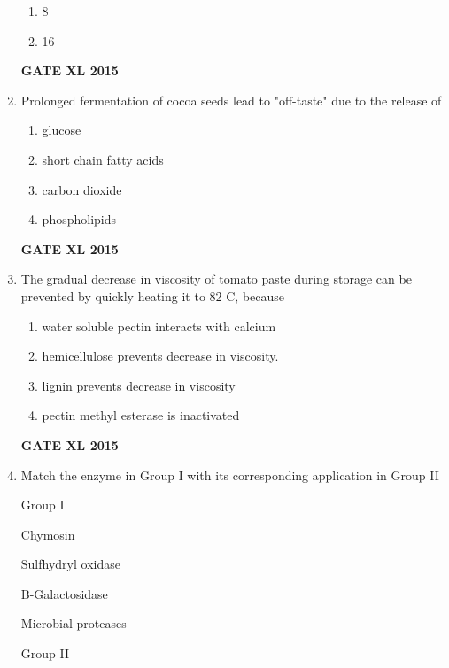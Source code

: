 \documentclass[journal,12pt,onecolumn]{IEEEtran}
\begin{document}
\begin{enumerate}
\begin{enumerate}
	    \item 8
            \item 16
    \end{enumerate}
\begin{flushright}\textbf{GATE XL 2015}\end{flushright}
\item Prolonged fermentation of cocoa seeds lead to "off-taste" due to the release of
    \begin{enumerate}
            \item glucose
	    \item short chain fatty acids 
	    \item  carbon dioxide
            \item phospholipids
    \end{enumerate}
\begin{flushright}\textbf{GATE XL 2015}\end{flushright}
\item The gradual decrease in viscosity of tomato paste during storage can be prevented by quickly heating it to 82 \degree C, because
    \begin{enumerate}
            \item water soluble pectin interacts with calcium
	    \item hemicellulose prevents decrease in viscosity.
	    \item lignin prevents decrease in viscosity
            \item pectin methyl esterase is inactivated
    \end{enumerate}
\begin{flushright}\textbf{GATE XL 2015}\end{flushright}
\item {Match the enzyme in Group I with its corresponding application in Group II}

	\begin{minipage}{0.5\textwidth}\begin{flushleft}
Group I

 Chymosin

 Sulfhydryl oxidase

 B-Galactosidase

 Microbial proteases
	\end{flushleft}
	\end{minipage}
	\begin{minipage}{0.5\textwidth}\begin{flushleft}
Group II


\end{flushleft}
\end{minipage}
\end{enumerate}
\end{document}
